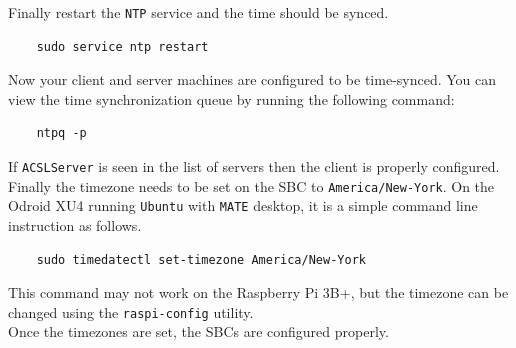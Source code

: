 \documentclass[12]{article}
\begin{document}
Finally restart the \texttt{NTP} service and the time should be synced.
\begin{lstlisting}
	sudo service ntp restart
\end{lstlisting}
Now your client and server machines are configured to be time-synced. You can view the time synchronization queue by running the following command:
\begin{lstlisting}
	ntpq -p
\end{lstlisting}
If \texttt{ACSLServer} is seen in the list of servers then the client is properly configured.\\
Finally the timezone needs to be set on the SBC to \texttt{America/New-York}. On the Odroid XU4 running \texttt{Ubuntu} with \texttt{MATE} desktop, it is a simple command line instruction as follows.
\begin{lstlisting}
	sudo timedatectl set-timezone America/New-York
\end{lstlisting}
This command may not work on the Raspberry Pi 3B+, but the timezone can be changed using the \texttt{raspi-config} utility.\\
Once the timezones are set, the SBCs are configured properly.
\end{document}
